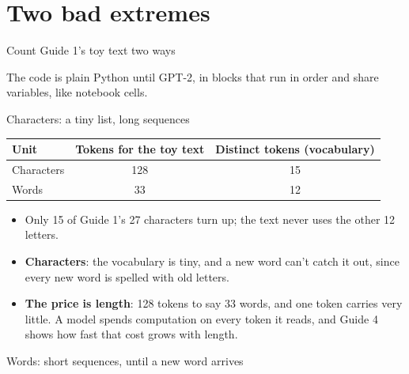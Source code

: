 \documentclass[aspectratio=169,11pt,t,\primeropts]{beamer}
\begin{document}
\section{Two bad extremes}

\begin{frame}{Count Guide 1's toy text two ways}
  \vspace{1mm}
  {\small The code is plain Python until GPT-2, in blocks that run in order and share variables,
  like notebook cells.\par}
\end{frame}

\begin{frame}{Characters: a tiny list, long sequences}
  \begin{center}\small
  \begin{tabular}{@{}lcc@{}}
    \toprule
    \textbf{Unit} & \textbf{Tokens for the toy text} & \textbf{Distinct tokens (vocabulary)}\\
    \midrule
    Characters & 128 & 15\\
    Words & 33 & 12\\
    \bottomrule
  \end{tabular}
  \end{center}
  \begin{itemize}
    \item Only 15 of Guide 1's 27 characters turn up; the text never uses the other 12 letters.
    \item<2-> \textbf{Characters}: the vocabulary is tiny, and a new word can't catch it out, since
      every new word is spelled with old letters.
    \item<3-> \textbf{The price is length}: 128 tokens to say 33 words, and one token carries very
      little. A model spends computation on every token it reads, and Guide 4 shows how fast that
      cost grows with length.
  \end{itemize}
\end{frame}

\begin{frame}{Words: short sequences, until a new word arrives}
\end{frame}
\end{document}

